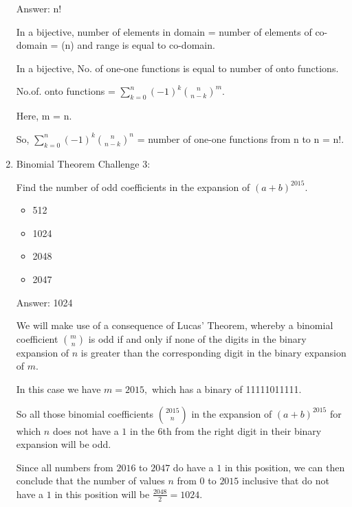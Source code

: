 \documentclass{article}
\begin{document}
\begin{enumerate}
     Answer: n!
    
    In a bijective, number of elements in domain = number of elements of co-domain = (n) and range is equal to co-domain.
    
    In a bijective, No. of one-one functions is equal to number of onto functions.
    
    No.of. onto functions =  \(\sum_{k=0}^n(-1)^k{{n}\choose{n-k}}^m\).
    
    Here, m = n.
    
    So,  \(\sum_{k=0}^n(-1)^k{{n}\choose{n-k}}^n\) = number of one-one functions from n to n = n!.

    \item Binomial Theorem Challenge 3:
    
    Find the number of odd coefficients in the expansion of  \( (a + b)^{2015} \).
    
    \begin{itemize}
        \item 512
        \item 1024
        \item 2048
        \item 2047
    \end{itemize}
    
    Answer: 1024
    
    We will make use of a consequence of Lucas' Theorem, whereby a binomial coefficient  \({{m}\choose{n}}\) is odd if and only if none of the digits in the binary expansion of  \(n\) is greater than the corresponding digit in the binary expansion of  \(m.\)

    In this case we have  \(m = 2015,\) which has a binary of 11111011111.
    
    So all those binomial coefficients  \({{2015}\choose{n}}\) in the expansion of  \((a + b)^{2015}\) for which  \(n\) does not have a  \(1\) in the  \(6\)th from the right digit in their binary expansion will be odd. 
    
    Since all numbers from  \(2016\) to  \(2047\) do have a  \(1\) in this position, we can then conclude that
    the number of values \(n\) from \(0\) to \(2015\) inclusive that do not have a  \(1\) in this position will be  \(\frac{2048}{2} = 1024.\)
    
\end{enumerate}
\end{document}
